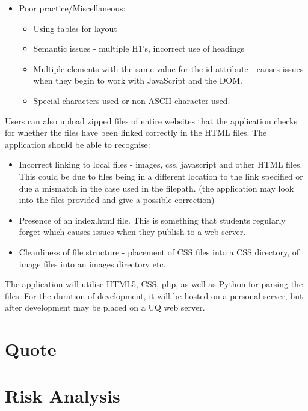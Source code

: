 \documentclass[12pt]{article}
\begin{document}
\begin{itemize}
\begin{itemize}
\end{itemize}
\item Poor practice/Miscellaneous:
\begin{itemize}
\item Using tables for layout
\item Semantic issues - multiple H1's, incorrect use of headings
\item Multiple elements with the same value for the id attribute - causes issues when they begin to work with JavaScript and the DOM.
\item Special characters used or non-ASCII character used.
\end{itemize}\end{itemize}

Users can also upload zipped files of entire websites that the application checks for whether the files have been linked correctly in the HTML files. The application should be able to recognise: 
\begin{itemize}
\item Incorrect linking to local files - images, css, javascript and other HTML files. This could be due to files being in a different location to the link specified or due a mismatch in the case used in the filepath. (the application may look into the files provided and give a possible correction)
\item  Presence of an index.html file. This is something that students regularly forget which causes issues when they publish to a web server.
\item  Cleanliness of file structure - placement of CSS files into a CSS directory, of image files into an images directory etc.
\end{itemize}

The application will utilise HTML5, CSS, php, as well as Python for parsing the files. For the duration of development, it will be hosted on a personal server, but after development may be placed on a UQ web server.

\section*{Quote}

\section*{Risk Analysis}
\end{document}
